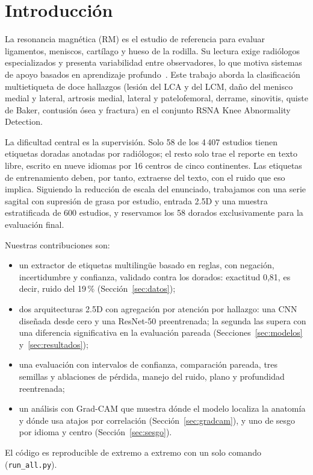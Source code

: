 \section{Introducción}
\label{sec:intro}

La resonancia magnética (RM) es el estudio de referencia para evaluar ligamentos, meniscos,
cartílago y hueso de la rodilla. Su lectura exige radiólogos especializados y presenta
variabilidad entre observadores, lo que motiva sistemas de apoyo basados en aprendizaje
profundo~\citep{bien2018mrnet}. Este trabajo aborda la clasificación multietiqueta de doce
hallazgos (lesión del LCA y del LCM, daño del menisco medial y lateral, artrosis medial,
lateral y patelofemoral, derrame, sinovitis, quiste de Baker, contusión ósea y fractura) en
el conjunto RSNA Knee Abnormality Detection.

La dificultad central es la supervisión. Solo 58 de los 4\,407 estudios tienen etiquetas
doradas anotadas por radiólogos; el resto solo trae el reporte en texto libre, escrito en
nueve idiomas por 16 centros de cinco continentes. Las etiquetas de entrenamiento deben, por
tanto, extraerse del texto, con el ruido que eso implica. Siguiendo la reducción de escala del
enunciado, trabajamos con una serie sagital con supresión de grasa por estudio, entrada 2.5D y
una muestra estratificada de 600 estudios, y reservamos los 58 dorados exclusivamente para
la evaluación final.

Nuestras contribuciones son:
\begin{itemize}
  \item un extractor de etiquetas multilingüe basado en reglas, con negación, incertidumbre
        y confianza, validado contra los dorados: exactitud 0,81, es decir, ruido del 19\,\%
        (Sección~\ref{sec:datos});
  \item dos arquitecturas 2.5D con agregación por atención por hallazgo: una CNN diseñada
        desde cero y una ResNet-50 preentrenada; la segunda las supera con una diferencia
        significativa en la evaluación pareada (Secciones~\ref{sec:modelos}
        y~\ref{sec:resultados});
  \item una evaluación con intervalos de confianza, comparación pareada, tres semillas y
        ablaciones de pérdida, manejo del ruido, plano y profundidad reentrenada;
  \item un análisis con Grad-CAM que muestra dónde el modelo localiza la anatomía y dónde
        usa atajos por correlación (Sección~\ref{sec:gradcam}), y uno de sesgo por idioma
        y centro (Sección~\ref{sec:sesgo}).
\end{itemize}
El código es reproducible de extremo a extremo con un solo comando (\texttt{run\_all.py}).

